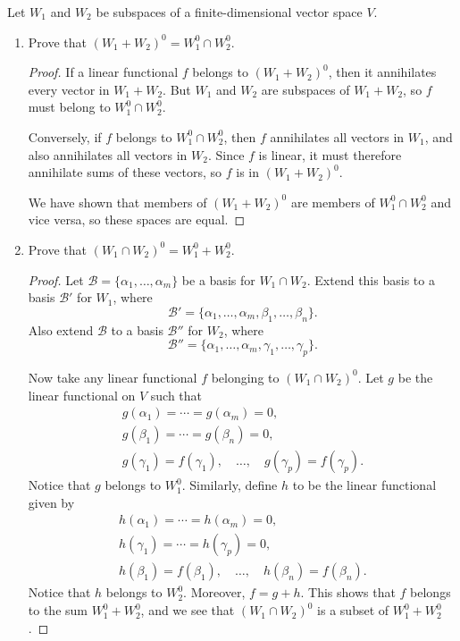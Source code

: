  Let $W_1$ and $W_2$ be subspaces of a finite-dimensional
vector space $V$.
\begin{enumerate}
\item Prove that $(W_1+W_2)^0 = W_1^0\cap W_2^0$.
  \begin{proof}
    If a linear functional $f$ belongs to $(W_1 + W_2)^0$, then it
    annihilates every vector in $W_1 + W_2$. But $W_1$ and $W_2$ are
    subspaces of $W_1 + W_2$, so $f$ must belong to $W_1^0\cap W_2^0$.

    Conversely, if $f$ belongs to $W_1^0\cap W_2^0$, then $f$
    annihilates all vectors in $W_1$, and also annihilates all vectors
    in $W_2$. Since $f$ is linear, it must therefore annihilate sums
    of these vectors, so $f$ is in $(W_1 + W_2)^0$.

    We have shown that members of $(W_1 + W_2)^0$ are members of
    $W_1^0\cap W_2^0$ and vice versa, so these spaces are equal.
  \end{proof}

\item Prove that $(W_1\cap W_2)^0 = W_1^0 + W_2^0$.
  \begin{proof}
    Let $\mathcal{B} = \{\alpha_1, \dots, \alpha_m\}$ be a basis for
    $W_1\cap W_2$. Extend this basis to a basis $\mathcal{B}'$ for
    $W_1$, where
    \begin{equation*}
      \mathcal{B}' = \{\alpha_1, \dots, \alpha_m,
      \beta_1, \dots, \beta_n\}.
    \end{equation*}
    Also extend $\mathcal{B}$ to a basis $\mathcal{B}''$ for $W_2$,
    where
    \begin{equation*}
      \mathcal{B}'' = \{\alpha_1, \dots, \alpha_m,
      \gamma_1, \dots, \gamma_p\}.
    \end{equation*}

    Now take any linear functional $f$ belonging to $(W_1\cap
    W_2)^0$. Let $g$ be the linear functional on $V$ such that
    \begin{gather*}
      g(\alpha_1) = \cdots = g(\alpha_m) = 0, \\
      g(\beta_1) = \cdots = g(\beta_n) = 0, \\
      g(\gamma_1) = f(\gamma_1), \quad\dots,\quad
      g(\gamma_p) = f(\gamma_p).
    \end{gather*}
    Notice that $g$ belongs to $W_1^0$. Similarly, define $h$ to be
    the linear functional given by
    \begin{gather*}
      h(\alpha_1) = \cdots = h(\alpha_m) = 0, \\
      h(\gamma_1) = \cdots = h(\gamma_p) = 0, \\
      h(\beta_1) = f(\beta_1), \quad\dots,\quad
      h(\beta_n) = f(\beta_n).
    \end{gather*}
    Notice that $h$ belongs to $W_2^0$. Moreover, $f = g + h$. This
    shows that $f$ belongs to the sum $W_1^0 + W_2^0$, and we see that
    $(W_1\cap W_2)^0$ is a subset of $W_1^0 + W_2^0$.


\end{proof}
\end{enumerate}
